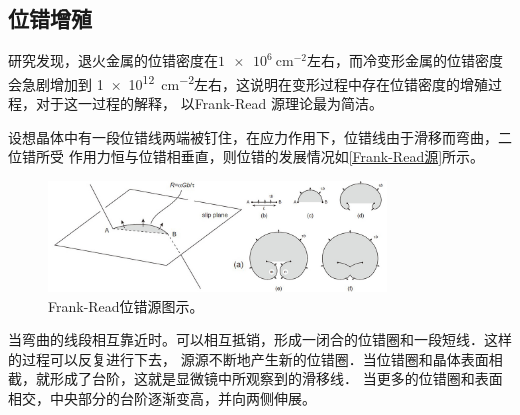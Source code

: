             \subsection{位错增殖}
                研究发现，退火金属的位错密度在$\SI{1e6}{\cm^{-2}}$左右，而冷变形金属的位错密度会急剧增加到
                \SI{1e12}{\cm^{-2}}左右，这说明在变形过程中存在位错密度的增殖过程，对于这一过程的解释，
                以Frank-Read 源理论最为简洁。

                设想晶体中有一段位错线两端被钉住，在应力作用下，位错线由于滑移而弯曲，二位错所受
                作用力恒与位错相垂直，则位错的发展情况如\autoref{Frank-Read源}所示。
                \begin{figure}[ht]
                    \centering
                    \includegraphics[width=0.8\textwidth]{fig/Frank_read_sources.jpg}
                    \caption{Frank-Read位错源图示。}
                    \label{Frank-Read源}
                \end{figure}
                当弯曲的线段相互靠近时。可以相互抵销，形成一闭合的位错圈和一段短线．这样的过程可以反复进行下去，
                源源不断地产生新的位错圈．当位错圈和晶体表面相截，就形成了台阶，这就是显微镜中所观察到的滑移线．
                当更多的位错圈和表面相交，中央部分的台阶逐渐变高，并向两侧伸展。

